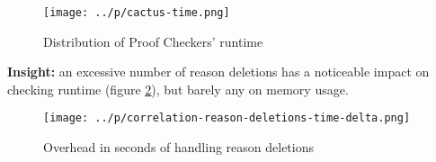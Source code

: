 \documentclass[final,hyperref={pdfpagelabels=true}]{beamer}
\begin{document}
\begin{frame}[fragile]
\begin{columns}[t]
\begin{column}{.45\textwidth}
    \begin{figure}
        \centering
        \caption{Distribution of Proof Checkers' runtime\label{fig:cactus-time}}
        \texttt{[image: ../p/cactus-time.png]}
    \end{figure}

    \textbf{Insight:} an excessive number of reason deletions
    has a noticeable impact on checking runtime (figure
    \ref{fig:correlation-reason-deletions-time-delta}), but barely any on
    memory usage.
    \vspace{1cm}

    \begin{figure}
        \centering
        \caption{Overhead in seconds of handling reason deletions\label{fig:correlation-reason-deletions-time-delta}}
        \texttt{[image: ../p/correlation-reason-deletions-time-delta.png]}
    \end{figure}

    \end{column}
  \end{columns}
\end{frame}
\end{document}
